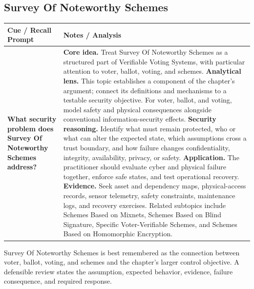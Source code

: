\documentclass[11pt]{article}
\newcommand{\CornellHeader}{%
\rowcolor{Navy}\color{white}\bfseries Cue / Recall Prompt & \color{white}\bfseries Notes / Analysis\\\hline}
\newcommand{\CornellRow}[2]{%
\cellcolor{CueGray}\RaggedRight\textbf{#1} & \RaggedRight #2\\\hline}
\begin{document}
\subsection*{Survey Of Noteworthy Schemes}
\begin{longtable}{>{\RaggedRight\arraybackslash}p{}|>{\RaggedRight\arraybackslash}p{}}
\CornellHeader
\CornellRow{What security problem does Survey Of Noteworthy Schemes address?}{\textbf{Core idea.} Treat Survey Of Noteworthy Schemes as a structured part of Verifiable Voting Systems, with particular attention to voter, ballot, voting, and schemes. \textbf{Analytical lens.} This topic establishes a component of the chapter's argument; connect its definitions and mechanisms to a testable security objective. For voter, ballot, and voting, model safety and physical consequences alongside conventional information-security effects. \textbf{Security reasoning.} Identify what must remain protected, who or what can alter the expected state, which assumptions cross a trust boundary, and how failure changes confidentiality, integrity, availability, privacy, or safety. \textbf{Application.} The practitioner should evaluate cyber and physical failure together, enforce safe states, and test operational recovery. \textbf{Evidence.} Seek asset and dependency maps, physical-access records, sensor telemetry, safety constraints, maintenance logs, and recovery exercises. Related subtopics include Schemes Based on Mixnets, Schemes Based on Blind Signature, Specific Voter-Verifiable Schemes, and Schemes Based on Homomorphic Encryption.}
\end{longtable}
\begin{topicsummary}
Survey Of Noteworthy Schemes is best remembered as the connection between voter, ballot, voting, and schemes and the chapter's larger control objective. A defensible review states the assumption, expected behavior, evidence, failure consequence, and required response.
\end{topicsummary}
\end{document}
